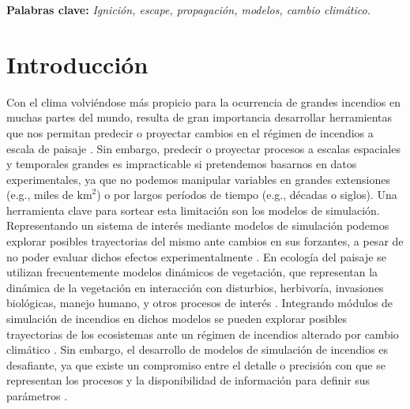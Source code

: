 \noindent \textbf{Palabras clave:} \textit{Ignición, escape, propagación, modelos, cambio climático.}

\section{Introducción}

Con el clima volviéndose más propicio para la ocurrencia de grandes incendios en muchas partes del mundo, resulta de gran importancia desarrollar herramientas que nos permitan predecir o proyectar cambios en el régimen de incendios a escala de paisaje \citep{senande2022spatial,bowman_vegetation_2020}. Sin embargo, predecir o proyectar procesos a escalas espaciales y temporales grandes es impracticable si pretendemos basarnos en datos experimentales, ya que no podemos manipular variables en grandes extensiones (e.g., miles de $\text{km}^2$) o por largos períodos de tiempo (e.g., décadas o siglos). Una herramienta clave para sortear esta limitación son los modelos de simulación. Representando un sistema de interés mediante modelos de simulación podemos explorar posibles trayectorias del mismo ante cambios en sus forzantes, a pesar de no poder evaluar dichos efectos experimentalmente \citep{brown2006landscape}. En ecología del paisaje se utilizan frecuentemente modelos dinámicos de vegetación, que representan la dinámica de la vegetación en interacción con disturbios, herbivoría, invasiones biológicas, manejo humano, y otros procesos de interés \citep{mladenoff2004landis, hartig2012connecting, turner2015landscape}. Integrando módulos de simulación de incendios en dichos modelos se pueden explorar posibles trayectorias de los ecosistemas ante un régimen de incendios alterado por cambio climático \citep{parisien2019applications}. Sin embargo, el desarrollo de modelos de simulación de incendios es desafiante, ya que existe un compromiso entre el detalle o precisión con que se representan los procesos y la disponibilidad de información para definir sus parámetros \citep{finney2005challenge}. 

